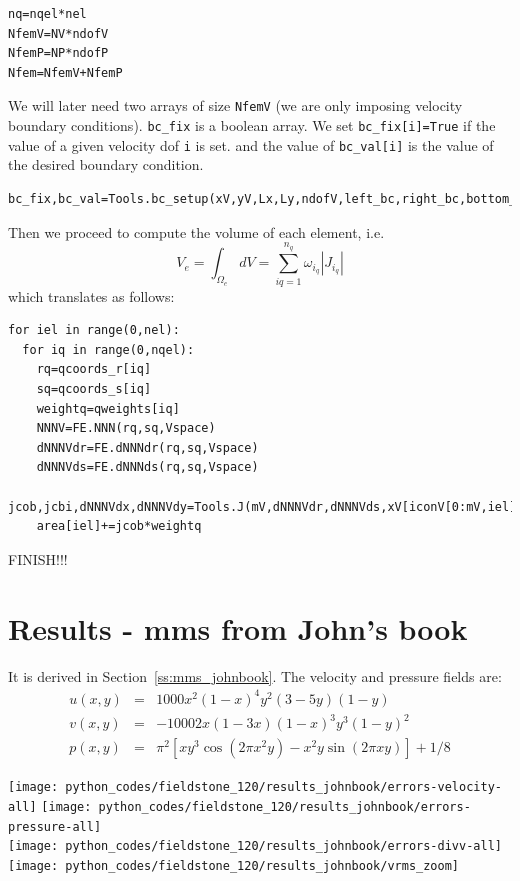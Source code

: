 \begin{lstlisting}
nq=nqel*nel
NfemV=NV*ndofV
NfemP=NP*ndofP
Nfem=NfemV+NfemP
\end{lstlisting}

We will later need two arrays of size \lstinline{NfemV} (we are only imposing
velocity boundary conditions). \lstinline{bc_fix} is a boolean array.
We set \lstinline{bc_fix[i]=True} if the value of a given velocity dof \lstinline{i} is set. 
and the value of \lstinline{bc_val[i]} is the value of the desired boundary condition.

\begin{lstlisting}
bc_fix,bc_val=Tools.bc_setup(xV,yV,Lx,Ly,ndofV,left_bc,right_bc,bottom_bc,top_bc)
\end{lstlisting}

Then we proceed to compute the volume of each element, i.e. 
\[
V_e = \int_{\Omega_e} dV = \sum_{iq=1}^{n_q} \omega_{i_q} |J_{i_q}|
\]
which translates as follows: 
\begin{lstlisting}
for iel in range(0,nel):
  for iq in range(0,nqel):
    rq=qcoords_r[iq]
    sq=qcoords_s[iq]
    weightq=qweights[iq]
    NNNV=FE.NNN(rq,sq,Vspace)
    dNNNVdr=FE.dNNNdr(rq,sq,Vspace)
    dNNNVds=FE.dNNNds(rq,sq,Vspace)
    jcob,jcbi,dNNNVdx,dNNNVdy=Tools.J(mV,dNNNVdr,dNNNVds,xV[iconV[0:mV,iel]],yV[iconV[0:mV,iel]])
    area[iel]+=jcob*weightq
\end{lstlisting}

FINISH!!!


\newpage
\section*{Results - mms from John's book}

It is derived in Section~\ref{ss:mms_johnbook}. The velocity and pressure fields are:
\begin{eqnarray}
u(x,y) &=& 1000 x^2(1-x)^4  y^2 (3-5y) (1-y) \\
v(x,y) &=& -1000 2x(1-3x) (1-x)^3  y^3(1-y)^2   \\
p(x,y) &=& \pi^2 [xy^3 \cos(2\pi x^2 y) - x^2y \sin(2\pi xy) ]+1/8
\end{eqnarray}

\begin{center}
\texttt{[image: python\_codes/fieldstone\_120/results\_johnbook/errors-velocity-all]}
\texttt{[image: python\_codes/fieldstone\_120/results\_johnbook/errors-pressure-all]}\\
\texttt{[image: python\_codes/fieldstone\_120/results\_johnbook/errors-divv-all]}
\texttt{[image: python\_codes/fieldstone\_120/results\_johnbook/vrms\_zoom]}
\end{center}


